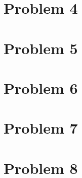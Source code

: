 \documentclass[a4paper]{article}
\begin{document}
\section{Problem 4}

\section{Problem 5}

\section{Problem 6}

\section{Problem 7}

\section{Problem 8}
\end{document}
